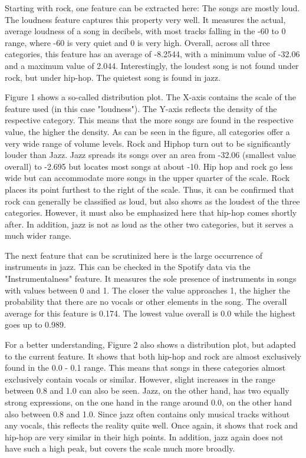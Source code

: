 Starting with rock, one feature can be extracted here: The songs are mostly loud.
The loudness feature captures this property very well.
It measures the actual, average loudness of a song in decibels, with most tracks falling
in the -60 to 0 range, where -60 is very quiet and 0 is very high.
Overall, across all three categories, this feature has an average of -8.2544,
with a minimum value of -32.06 and a maximum value of 2.044.
Interestingly, the loudest song is not found under rock, but under hip-hop.
The quietest song is found in jazz. 

Figure 1  shows a so-called distribution plot.
The X-axis contains the scale of the feature used (in this case "loudness").
The Y-axis reflects the density of the respective category.
This means that the more songs are found in the respective value, the higher the density.
As can be seen in the figure, all categories offer a very wide range of volume levels.
Rock and Hiphop turn out to be significantly louder than Jazz.
Jazz spreads its songs over an area from -32.06 (smallest value overall) to -2.695 but locates
most songs at about -10. Hip hop and rock go less wide but can accommodate more songs in the upper
quarter of the scale. Rock places its point furthest to the right of the scale.
Thus, it can be confirmed that rock can generally be classified as loud,
but also shows as the loudest of the three categories.
However, it must also be emphasized here that hip-hop comes shortly after.
In addition, jazz is not as loud as the other two categories, but it serves a much wider range. 

The next feature that can be scrutinized here is the large occurrence of instruments in jazz.
This can be checked in the Spotify data via the "Instrumentalness" feature.
It measures the sole presence of instruments in songs with values between 0 and 1.
The closer the value approaches 1, the higher the probability that there are no vocals or other
elements in the song. The overall average for this feature is 0.174.
The lowest value overall is 0.0 while the highest goes up to 0.989.

For a better understanding, Figure 2  also shows a distribution plot,
but adapted to the current feature.
It shows that both hip-hop and rock are almost exclusively found in the 0.0 - 0.1 range.
This means that songs in these categories almost exclusively contain vocals or similar.
However, slight increases in the range between 0.8 and 1.0 can also be seen. Jazz,
on the other hand, has two equally strong expressions, on the one hand in the range around 0.0,
on the other hand also between 0.8 and 1.0. Since jazz often contains only musical tracks without
any vocals, this reflects the reality quite well.
Once again, it shows that rock and hip-hop are very similar in their high points.
In addition, jazz again does not have such a high peak, but covers the scale much more broadly.

